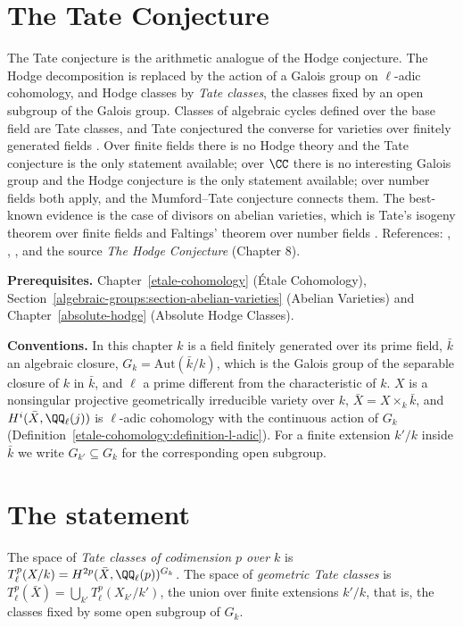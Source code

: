 \section{The Tate Conjecture}\label{absolute-hodge:section-tate-conjecture}
The Tate conjecture is the arithmetic analogue of the Hodge conjecture. The Hodge decomposition is replaced by the action of a Galois group on $\ell$-adic cohomology, and Hodge classes by
\emph{Tate classes}, the classes fixed by an open subgroup of the Galois group. Classes of algebraic cycles defined over the base field are Tate classes, and Tate conjectured the converse for
varieties over finitely generated fields \cite{tate-1965}. Over finite fields there is no Hodge theory and the Tate conjecture is the only statement available; over $\CC$ there is no interesting Galois
group and the Hodge conjecture is the only statement available; over number fields both apply, and the Mumford--Tate conjecture connects them. The best-known evidence is the case of divisors on abelian
varieties, which is Tate's isogeny theorem over finite fields \cite{tate-1966} and Faltings' theorem over number fields \cite{faltings-1983}. References: \cite{tate-1965}, \cite{totaro-2017},
\cite{milne-etale}, and the source \emph{The Hodge Conjecture} (Chapter 8).

\noindent\textbf{Prerequisites.} Chapter~\ref{etale-cohomology} (\'Etale Cohomology), Section~\ref{algebraic-groups:section-abelian-varieties} (Abelian Varieties) and Chapter~\ref{absolute-hodge} (Absolute Hodge Classes).

\noindent\textbf{Conventions.} In this chapter $k$ is a field finitely generated over its prime field, $\bar k$ an algebraic closure, $G_k = \mathrm{Aut}(\bar k/k)$, which is the Galois group of the separable
closure of $k$ in $\bar k$, and $\ell$ a prime different from the characteristic of $k$. $X$ is a nonsingular projective geometrically irreducible variety over $k$, $\bar X = X \times_k\bar k$, and $H^i(\bar X, \QQ_\ell(j))$ is $\ell$-adic cohomology with the continuous
action of $G_k$ (Definition~\ref{etale-cohomology:definition-l-adic}). For a finite extension $k'/k$ inside $\bar k$ we write $G_{k'} \subseteq G_k$ for the corresponding open subgroup.

\section{The statement}\label{absolute-hodge:section-statement}

\begin{definition}\label{absolute-hodge:definition-tate-classes}
The space of \emph{Tate classes of codimension $p$ over $k$} is $T^p_\ell(X/k) = H^{2p}(\bar X, \QQ_\ell(p))^{G_k}$. The space of \emph{geometric Tate classes} is
$T^p_\ell(\bar X) = \bigcup_{k'}T^p_\ell(X_{k'}/k')$, the union over finite extensions $k'/k$, that is, the classes fixed by some open subgroup of $G_k$.
\end{definition}

